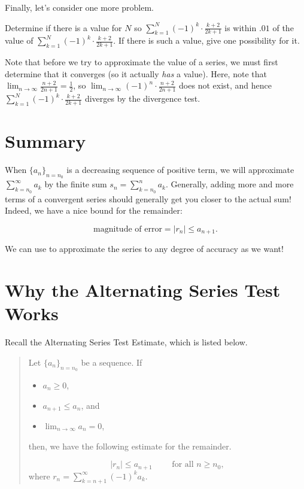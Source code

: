 \documentclass{ximera}
\begin{document}
Finally, let's consider one more problem.
\begin{question}
Determine if there is a value for $N$ so $\sum_{k=1}^{N} (-1)^k \cdot \frac{k+2}{2k+1}$ is within $.01$ of the value of $\sum_{k=1}^{N} (-1)^k \cdot \frac{k+2}{2k+1}$.  If there is such a value, give one possibility for it.

\begin{multipleChoice}
\end{multipleChoice}

\begin{feedback}
Note that before we try to approximate the value of a series, we must first determine that it converges (so it actually \emph{has} a value).  Here, note that $\lim_{n \to \infty} \frac{n+2}{2n+1} = \frac{1}{2}$, so $\lim_{n \to \infty} (-1)^n \cdot \frac{n+2}{2n+1}$ does not exist, and hence $\sum_{k=1}^{N} (-1)^k \cdot \frac{k+2}{2k+1}$ diverges by the divergence test.
\end{feedback}
\end{question}

\section{Summary}

When $\{a_n\}_{n = n_0}$ is a decreasing sequence of positive term, we will approximate $\sum_{k=n_0}^{\infty} a_k$ by the finite sum $s_n =\sum_{k=n_0}^{n} a_k$.  Generally, adding more and more terms of a convergent series should generally get you closer to the actual sum!
Indeed, we have a nice bound for the remainder:

\[ \textrm{magnitude of error} = |r_n| \leq a_{n+1}.\]  

We can use to approximate the series to any degree of accuracy as we want!





\section{Why the Alternating Series Test Works}

Recall the Alternating Series Test Estimate, which is listed below.

\begin{quote}
Let $\{a_n\}_{n=n_0}$ be a sequence.  If

\begin{itemize}
\item $a_n \geq 0$,
\item $a_{n+1} \leq a_n$, and
\item $\lim_{n \to\infty} a_n=0$, 
\end{itemize}

then, we have the following estimate for the remainder.

\[
\big| r_n \big| \leq a_{n+1} \qquad \textrm{ for all } n \geq n_0,
\]
where $r_n = \sum_{k=n+1}^{\infty} (-1)^k a_k$.
\end{quote}
\end{document}
